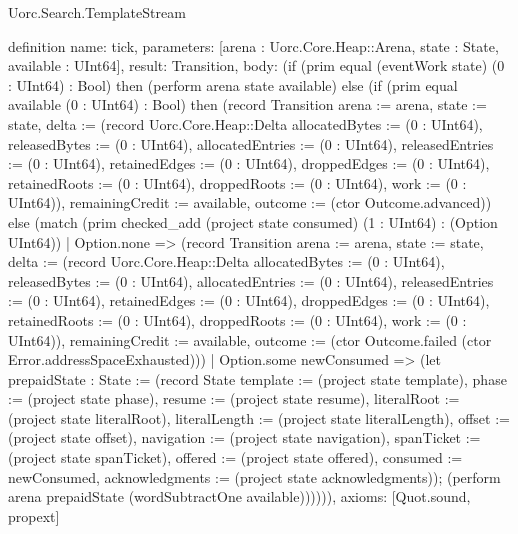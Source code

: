 \begin{lexlean}{Uorc.Search.TemplateStream}
\begin{semanticmodule}
definition{
  name: tick,
  parameters: [arena : Uorc.Core.Heap::Arena, state : State, available : UInt64],
  result: Transition,
  body: (if (prim equal (eventWork state) (0 : UInt64) : Bool) then (perform arena state available) else (if (prim equal available (0 : UInt64) : Bool) then (record Transition {arena := arena, state := state, delta := (record Uorc.Core.Heap::Delta {allocatedBytes := (0 : UInt64), releasedBytes := (0 : UInt64), allocatedEntries := (0 : UInt64), releasedEntries := (0 : UInt64), retainedEdges := (0 : UInt64), droppedEdges := (0 : UInt64), retainedRoots := (0 : UInt64), droppedRoots := (0 : UInt64), work := (0 : UInt64)}), remainingCredit := available, outcome := (ctor Outcome.advanced)}) else (match (prim checked_add (project state consumed) (1 : UInt64) : (Option UInt64))
    | Option.none => (record Transition {arena := arena, state := state, delta := (record Uorc.Core.Heap::Delta {allocatedBytes := (0 : UInt64), releasedBytes := (0 : UInt64), allocatedEntries := (0 : UInt64), releasedEntries := (0 : UInt64), retainedEdges := (0 : UInt64), droppedEdges := (0 : UInt64), retainedRoots := (0 : UInt64), droppedRoots := (0 : UInt64), work := (0 : UInt64)}), remainingCredit := available, outcome := (ctor Outcome.failed (ctor Error.addressSpaceExhausted))})
    | Option.some newConsumed => (let prepaidState : State := (record State {template := (project state template), phase := (project state phase), resume := (project state resume), literalRoot := (project state literalRoot), literalLength := (project state literalLength), offset := (project state offset), navigation := (project state navigation), spanTicket := (project state spanTicket), offered := (project state offered), consumed := newConsumed, acknowledgments := (project state acknowledgments)}); (perform arena prepaidState (wordSubtractOne available)))))),
  axioms: [Quot.sound, propext]
}


\end{semanticmodule}
\end{lexlean}
